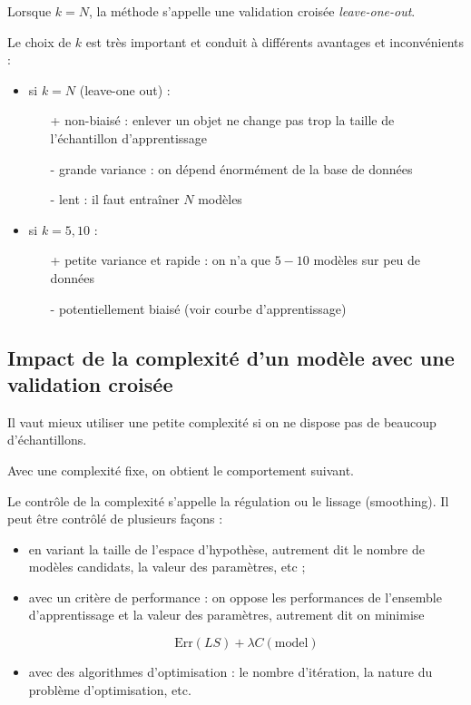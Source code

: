 	Lorsque $k = N$, la méthode s'appelle une validation croisée \textit{leave-one-out}.
	
	Le choix de $k$ est très important et conduit à différents avantages et inconvénients :
	
	\begin{itemize}
		\item si $k = N$ (leave-one out) :
		\begin{itemize}
			\item[+] non-biaisé : enlever un objet ne change pas trop la taille de l'échantillon d'apprentissage
			\item[-] grande variance : on dépend énormément de la base de données
			\item[-] lent : il faut entraîner $N$ modèles
		\end{itemize}
		\item si $k = 5, 10$ :
		
		\begin{itemize}
			\item[+] petite variance et rapide : on n'a que $5-10$ modèles sur peu de données
			\item[-] potentiellement biaisé (voir courbe d'apprentissage)
		\end{itemize}
	\end{itemize}
	
	
\subsection{Impact de la complexité d'un modèle avec une validation croisée}


	Il vaut mieux utiliser une petite complexité si on ne dispose pas de beaucoup d'échantillons.

	Avec une complexité fixe, on obtient le comportement suivant.


	Le contrôle de la complexité s'appelle la régulation ou le lissage (smoothing). Il peut être contrôlé de plusieurs façons :

	\begin{itemize}
		\item en variant la taille de l'espace d'hypothèse, autrement dit le nombre de modèles candidats, la valeur des paramètres, etc ;
		\item avec un critère de performance : on oppose les performances de l'ensemble d'apprentissage et la valeur des paramètres, autrement dit on minimise
	
		$$\text{Err}(LS) + \lambda C(\text{model})$$
	
		\item avec des algorithmes d'optimisation : le nombre d'itération, la nature du problème d'optimisation, etc.
	\end{itemize}

